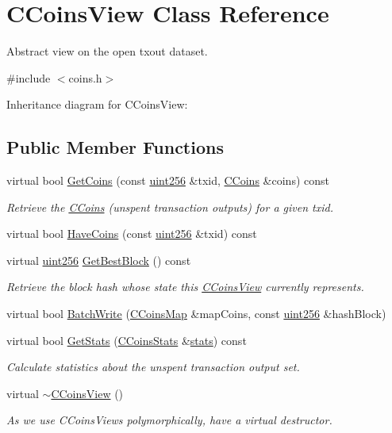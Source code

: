 \hypertarget{class_c_coins_view}{}\section{C\+Coins\+View Class Reference}
\label{class_c_coins_view}


Abstract view on the open txout dataset.  




{\ttfamily \#include $<$coins.\+h$>$}



Inheritance diagram for C\+Coins\+View\+:
\subsection*{Public Member Functions}
\begin{DoxyCompactItemize}
\item 
virtual bool \hyperlink{class_c_coins_view_aaf5668eb2f9033583d7072dc2a3f96ef}{Get\+Coins} (const \hyperlink{classuint256}{uint256} \&txid, \hyperlink{class_c_coins}{C\+Coins} \&coins) const 
\begin{DoxyCompactList}\small\item\em Retrieve the \hyperlink{class_c_coins}{C\+Coins} (unspent transaction outputs) for a given txid. \end{DoxyCompactList}\item 
virtual bool \hyperlink{class_c_coins_view_a14c8db07cb11223426bb660861389f3a}{Have\+Coins} (const \hyperlink{classuint256}{uint256} \&txid) const 
\item 
virtual \hyperlink{classuint256}{uint256} \hyperlink{class_c_coins_view_a556cf7661ff49df1ada5cd0ad552f8db}{Get\+Best\+Block} () const 
\begin{DoxyCompactList}\small\item\em Retrieve the block hash whose state this \hyperlink{class_c_coins_view}{C\+Coins\+View} currently represents. \end{DoxyCompactList}\item 
virtual bool \hyperlink{class_c_coins_view_ad7dc37396ca4fac7014cea06fec7178e}{Batch\+Write} (\hyperlink{coins_8h_a2886ba2fd0428bae777e1cbcabc02834}{C\+Coins\+Map} \&map\+Coins, const \hyperlink{classuint256}{uint256} \&hash\+Block)
\item 
virtual bool \hyperlink{class_c_coins_view_afd645b903fba9c6b84bdb898d764f5fc}{Get\+Stats} (\hyperlink{struct_c_coins_stats}{C\+Coins\+Stats} \&\hyperlink{db__bench_8cc_a5925d216740c89f43482df806fd14e8c}{stats}) const 
\begin{DoxyCompactList}\small\item\em Calculate statistics about the unspent transaction output set. \end{DoxyCompactList}\item 
virtual \hyperlink{class_c_coins_view_a7ffb4218bf991ddff47339e44c8710da}{$\sim$\+C\+Coins\+View} ()
\begin{DoxyCompactList}\small\item\em As we use C\+Coins\+Views polymorphically, have a virtual destructor. \end{DoxyCompactList}\end{DoxyCompactItemize}


